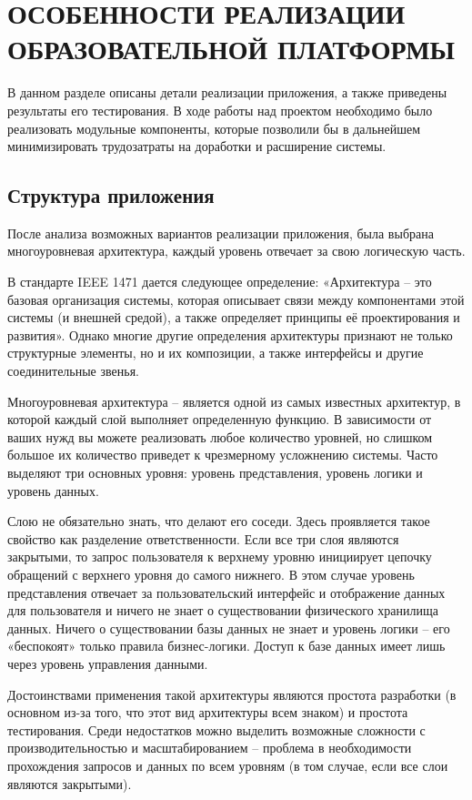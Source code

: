\section{ОСОБЕННОСТИ РЕАЛИЗАЦИИ ОБРАЗОВАТЕЛЬНОЙ ПЛАТФОРМЫ}

В данном разделе описаны детали реализации приложения, а также приведены результаты его тестирования.
В ходе работы над проектом необходимо было реализовать модульные компоненты, которые позволили
бы в дальнейшем минимизировать трудозатраты на доработки и расширение системы.

\subsection{Структура приложения}

После анализа возможных вариантов реализации приложения, была выбрана многоуровневая архитектура,
каждый уровень отвечает за свою логическую часть.

В стандарте IEEE 1471 дается следующее определение: «Архитектура – это базовая организация
системы, которая описывает связи между компонентами этой системы (и внешней средой),
а также определяет принципы её проектирования и развития». Однако многие другие определения
архитектуры признают не только структурные элементы, но и их композиции, а также интерфейсы
и другие соединительные звенья.

Многоуровневая архитектура – является одной из самых известных архитектур, в которой
каждый слой выполняет определенную функцию. В зависимости от ваших нужд вы можете
реализовать любое количество уровней, но слишком большое их количество приведет к
чрезмерному усложнению системы. Часто выделяют три основных уровня: уровень представления,
уровень логики и уровень данных.

Слою не обязательно знать, что делают его соседи. Здесь проявляется такое свойство как
разделение ответственности. Если все три слоя являются закрытыми, то запрос пользователя
к верхнему уровню инициирует цепочку обращений с верхнего уровня до самого нижнего.
В этом случае уровень представления отвечает за пользовательский интерфейс и отображение
данных для пользователя и ничего не знает о существовании физического хранилища данных.
Ничего о существовании базы данных не знает и уровень логики – его «беспокоят» только
правила бизнес-логики. Доступ к базе данных имеет лишь через уровень управления данными.

Достоинствами применения такой архитектуры являются простота разработки
(в основном из-за того, что этот вид архитектуры всем знаком) и простота тестирования.
Среди недостатков можно выделить возможные сложности с производительностью и масштабированием –
проблема в необходимости прохождения запросов и данных по всем уровням
(в том случае, если все слои являются закрытыми).

